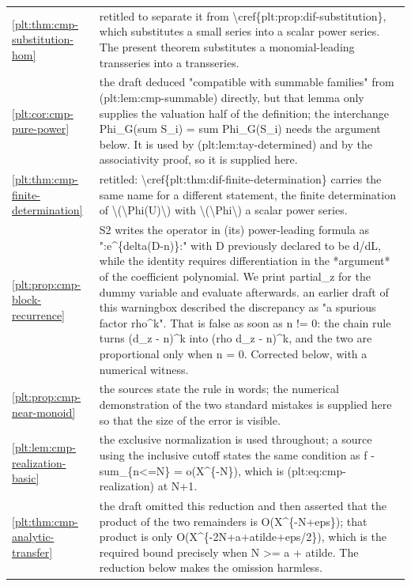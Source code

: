 \documentclass[11pt,oneside]{article}
\theoremstyle{plain}
\theoremstyle{definition}
\theoremstyle{remark}
\begin{document}
\begin{longtable}{@{}p{} p{}@{}}
\cref{plt:thm:cmp-substitution-hom} & retitled to separate it from \textbackslash cref\{plt:prop:dif-substitution\}, which substitutes a small series into a scalar power series. The present theorem substitutes a monomial-leading transseries into a transseries.\\
\cref{plt:cor:cmp-pure-power} & the draft deduced "compatible with summable families" from (plt:lem:cmp-summable) directly, but that lemma only supplies the valuation half of the definition; the interchange Phi\_G(sum S\_i) = sum Phi\_G(S\_i) needs the argument below. It is used by (plt:lem:tay-determined) and by the associativity proof, so it is supplied here.\\
\cref{plt:thm:cmp-finite-determination} & retitled: \textbackslash cref\{plt:thm:dif-finite-determination\} carries the same name for a different statement, the finite determination of \textbackslash (\textbackslash Phi(U)\textbackslash ) with \textbackslash (\textbackslash Phi\textbackslash ) a scalar power series.\\
\cref{plt:prop:cmp-block-recurrence} & S2 writes the operator in (its) power-leading formula as ":e\textasciicircum \{delta(D-n)\}:" with D previously declared to be d/dL, while the identity requires differentiation in the *argument* of the coefficient polynomial. We print partial\_z for the dummy variable and evaluate afterwards. an earlier draft of this warningbox described the discrepancy as "a spurious factor rho\textasciicircum k". That is false as soon as n != 0: the chain rule turns (d\_z - n)\textasciicircum k into (rho d\_z - n)\textasciicircum k, and the two are proportional only when n = 0. Corrected below, with a numerical witness.\\
\cref{plt:prop:cmp-near-monoid} & the sources state the rule in words; the numerical demonstration of the two standard mistakes is supplied here so that the size of the error is visible.\\
\cref{plt:lem:cmp-realization-basic} & the exclusive normalization is used throughout; a source using the inclusive cutoff states the same condition as f - sum\_\{n<=N\} = o(X\textasciicircum \{-N\}), which is (plt:eq:cmp-realization) at N+1.\\
\cref{plt:thm:cmp-analytic-transfer} & the draft omitted this reduction and then asserted that the product of the two remainders is O(X\textasciicircum \{-N+eps\}); that product is only O(X\textasciicircum \{-2N+a+atilde+eps/2\}), which is the required bound precisely when N >= a + atilde. The reduction below makes the omission harmless.\\

\end{longtable}
\end{document}
